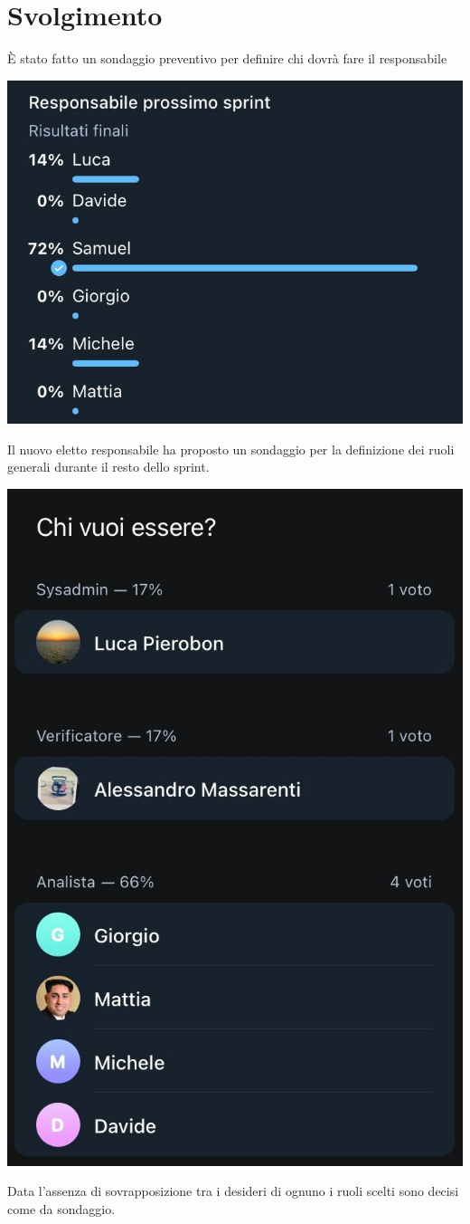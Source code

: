 \section{Svolgimento}

È stato fatto un sondaggio preventivo per definire chi dovrà fare il responsabile
\begin{center}
\includegraphics[width = 0.5\linewidth]{img/sondaggio_responsabile.png}
\end{center}

Il nuovo eletto responsabile ha proposto un sondaggio per la definizione dei ruoli generali durante il resto dello sprint.

\begin{center}
    \includegraphics[width = 0.4\linewidth]{img/ruoli.png}
\end{center}

Data l'assenza di sovrapposizione tra i desideri di ognuno i ruoli scelti sono decisi come da sondaggio.